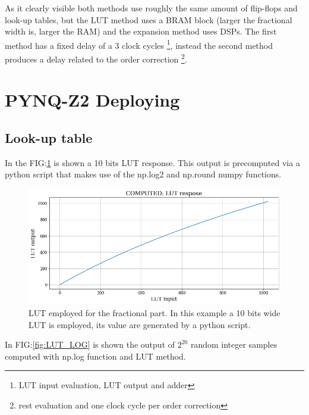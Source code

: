 \documentclass[12pt]{article}
\begin{document}
As it clearly visible both methods use roughly the same amount of flip-flops and look-up tables, but the LUT method uses a BRAM block (larger the fractional width is, larger the RAM) and the expansion method uses DSPs.  
The first method has a fixed delay of a 3 clock cycles \footnote{LUT input evaluation, LUT output and adder}, instead the second method produces a delay related to the order correction \footnote{rest evaluation and one clock cycle per order correction}.


\section{PYNQ-Z2 Deploying}

\subsection{Look-up table}

In the FIG:\ref{fig:LUT_resp} is shown a 10 bits LUT response. This output is precomputed via a python script that makes use of the np.log2 and np.round numpy functions. 
\begin{figure}[h]
    \includegraphics[width=1.0\textwidth]{Images/LUT_response.png}
    \caption{LUT employed for the fractional part. In this example a 10 bits wide LUT is employed, its value are generated by a python script.}
    \label{fig:LUT_resp}
\end{figure}

In FIG:\ref{fig:LUT_LOG} is shown the output of $2^{20}$ random integer samples computed with np.log function and LUT method.
\end{document}
